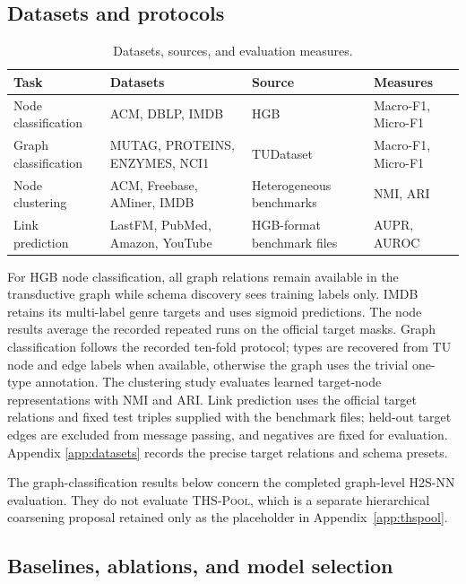 \documentclass{article}
\newcommand{\method}{\textsc{H2S-NN}}
\newcommand{\thspool}{\textsc{THS-Pool}}
\begin{document}
\subsection{Datasets and protocols}
\begin{table}[t]
  \centering
  \caption{Datasets, sources, and evaluation measures.}
  \label{tab:datasets}
  \small
  \begin{tabularx}{\textwidth}{llXX}
    \toprule
    \textbf{Task} & \textbf{Datasets} & \textbf{Source} & \textbf{Measures} \\
    \midrule
    Node classification & ACM, DBLP, IMDB & HGB & Macro-F1, Micro-F1 \\
    Graph classification & MUTAG, PROTEINS, ENZYMES, NCI1 & TUDataset & Macro-F1, Micro-F1 \\
    Node clustering & ACM, Freebase, AMiner, IMDB & Heterogeneous benchmarks & NMI, ARI \\
    Link prediction & LastFM, PubMed, Amazon, YouTube & HGB-format benchmark files & AUPR, AUROC \\
    \bottomrule
  \end{tabularx}
\end{table}

For HGB node classification, all graph relations remain available in the transductive graph while
schema discovery sees training labels only. IMDB retains its multi-label genre targets and uses
sigmoid predictions. The node results average the recorded repeated runs on the official target
masks. Graph classification follows the recorded ten-fold protocol; types are recovered from TU
node and edge labels when available, otherwise the graph uses the trivial one-type annotation. The
clustering study evaluates learned target-node representations with NMI and ARI. Link prediction
uses the official target relations and fixed test triples supplied with the benchmark files; held-out
target edges are excluded from message passing, and negatives are fixed for evaluation. Appendix
\ref{app:datasets} records the precise target relations and schema presets.

The graph-classification results below concern the completed graph-level \method{} evaluation. They
do not evaluate \thspool{}, which is a separate hierarchical coarsening proposal retained only as
the placeholder in Appendix~\ref{app:thspool}.

\subsection{Baselines, ablations, and model selection}
\end{document}

